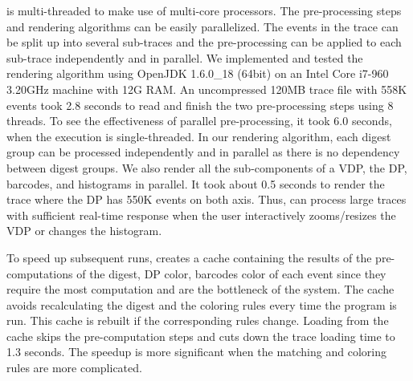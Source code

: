  is multi-threaded to make use of multi-core processors.
The pre-processing steps and rendering algorithms can be easily parallelized.
The events in the trace can be split up into several sub-traces and 
the pre-processing can be applied to each sub-trace
independently and in parallel.
We implemented and tested the rendering algorithm using
OpenJDK 1.6.0\_18 (64bit) on an Intel Core i7-960 3.20GHz
machine with 12G RAM.
An uncompressed 120MB trace file with 558K events took 2.8 seconds
to read and finish the two pre-processing steps using 8 threads.
To see the effectiveness of parallel pre-processing, it took 6.0 seconds,
when the execution is single-threaded.
In our rendering algorithm, each digest group can be processed
independently and in parallel as there is no dependency between digest groups.
We also render all the sub-components
of a VDP, the DP, barcodes, and histograms in parallel.
It took about 0.5 seconds to render the trace where the DP has 550K events
on both axis.
Thus,  can process large traces with sufficient real-time response
when the user interactively zooms/resizes the VDP or changes the histogram.

To speed up subsequent runs,  creates a cache containing the results
of the pre-computations of the digest, DP color, barcodes color
of each event since they require the most computation
and are the bottleneck of the system. The cache avoids recalculating the
digest and the coloring rules every time the program is run.
This cache is rebuilt if the corresponding rules change.
Loading from the cache skips the pre-computation steps and
cuts down the trace loading time to 1.3 seconds.
The speedup is more significant when the matching and coloring rules are
more complicated.


